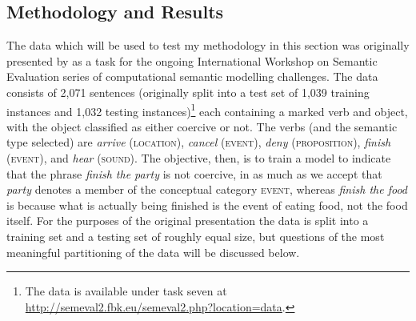 \subsection{Methodology and Results}
The data which will be used to test my methodology in this section was originally presented by \cite{PustejovskyEA2010} as a task for the ongoing International Workshop on Semantic Evaluation series of computational semantic modelling challenges.  The data consists of 2,071 sentences (originally split into a test set of 1,039 training instances and 1,032 testing instances)\footnote{The data is available under task seven at \url{http://semeval2.fbk.eu/semeval2.php?location=data}.} each containing a marked verb and object, with the object classified as either coercive or not.     The verbs (and the semantic type selected) are \emph{arrive} (\textsc{location}), \emph{cancel} (\textsc{event}), \emph{deny} (\textsc{proposition}), \emph{finish} (\textsc{event}), and \emph{hear} (\textsc{sound}).  The objective, then, is to train a model to indicate that the phrase \emph{finish the party} is not coercive, in as much as we accept that \emph{party} denotes a member of the conceptual category \textsc{event}, whereas \emph{finish the food} is because what is actually being finished is the event of eating food, not the food itself.  For the purposes of the original presentation the data is split into a training set and a testing set of roughly equal size, but questions of the most meaningful partitioning of the data will be discussed below.

